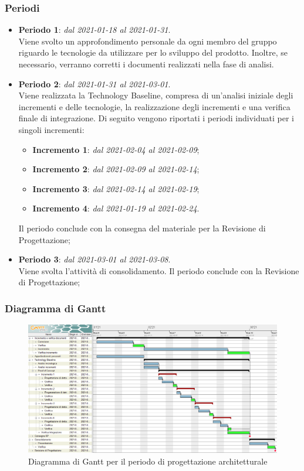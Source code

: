 \subsubsection{Periodi}

\begin{itemize}
\item \textbf{Periodo 1}: \textit{dal 2021-01-18 al 2021-01-31}. \\
Viene svolto un approfondimento personale da ogni membro del gruppo riguardo le tecnologie da utilizzare per lo sviluppo del prodotto. Inoltre, se necessario, verranno corretti i documenti realizzati nella fase di analisi.
\item \textbf{Periodo 2}: \textit{dal 2021-01-31 al 2021-03-01}. \\
Viene realizzata la Technology Baseline, compresa di un'analisi iniziale degli incrementi e delle tecnologie, la realizzazione degli incrementi e una verifica finale di integrazione. Di seguito vengono riportati i periodi individuati per i singoli incrementi:
\begin{itemize}
\item \textbf{Incremento 1}: \textit{dal 2021-02-04 al 2021-02-09};
\item \textbf{Incremento 2}: \textit{dal 2021-02-09 al 2021-02-14};
\item \textbf{Incremento 3}: \textit{dal 2021-02-14 al 2021-02-19};
\item \textbf{Incremento 4}: \textit{dal 2021-01-19 al 2021-02-24}.
\end{itemize}
Il periodo conclude con la consegna del materiale per la Revisione di Progettazione;
\item \textbf{Periodo 3}: \textit{dal 2021-03-01 al 2021-03-08}. \\
Viene svolta l'attività di consolidamento. Il periodo conclude con la Revisione di Progettazione;
\end{itemize}

\subsubsection{Diagramma di Gantt}

\begin{figure}[H]
\centering

\centerline{\includegraphics[scale=0.5]{res/Pianificazione/Gantt/progettazione}}
\caption{Diagramma di Gantt per il periodo di progettazione architetturale}
\end{figure}